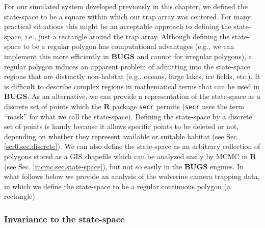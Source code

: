 For our simulated system developed previously in this chapter, we
defined the state-space to be a square within which our trap array was
centered. For many practical situations this might be an acceptable
approach to defining the state-space, i.e., just a rectangle around
the trap array.
Although defining the state-space to be a regular polygon has
computational advantages (e.g., we can implement this more efficiently
in {\bf BUGS} and cannot for irregular polygons), a regular polygon
induces an apparent problem of admitting into the state-space regions
that are distinctly non-habitat (e.g., oceans, large lakes, ice
fields, etc.).  It is difficult to describe complex regions in
mathematical terms that can be used in {\bf BUGS}. As an alternative,
we can provide a representation of the state-space as a discrete set
of points which the {\bf R} package \mbox{\tt secr}
\citep{efford:2011} permits (\mbox{\tt secr} uses the term ``mask''
for what we call the state-space).  Defining the state-space by a
discrete set of points is handy because it allows specific points to
be deleted or not, depending on whether they represent available or
suitable habitat (see Sec.  \ref{scr0.sec.discrete}).  We can also
define the state-space as an arbitrary collection of polygons stored
as a GIS shapefile which can be analyzed easily by MCMC in {\bf R}
(see Sec. \ref{mcmc.sec.state-space}), but not so easily in the {\bf
  BUGS} engines.  In what follows below we provide an analysis of the
wolverine camera trapping data, in which we define the state-space to
be a regular continuous polygon (a rectangle).


\subsubsection{Invariance to the state-space}
\label{scr0.sec.invariance}

